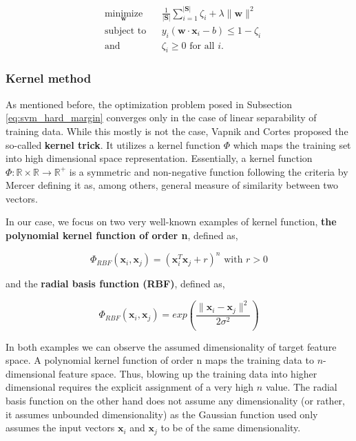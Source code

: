 \documentclass[pdftex,12pt,a4paper]{report}
\begin{document}
\begin{equation*}
\begin{aligned}
& \underset{\mathbf{
w}}{\text{minimize}}
& & \frac{1}{\vert \mathbf{S} \vert} \sum_{i=1}^{\vert \mathbf{S} \vert} \zeta_i + \lambda \| \mathbf{w} \|^2 \\
& \text{subject to}
& & y_i (\mathbf{w} \cdot \mathbf{x}_i - b) \leq 1 - \zeta_i \\
& \text{and} && \zeta_i \geq 0 \text{ for all } i.
\end{aligned}
\end{equation*}

\subsubsection*{Kernel method}

As mentioned before, the optimization problem posed in Subsection \ref{eq:svm_hard_margin} converges only in the case of linear separability of training data. While this mostly is not the case, Vapnik and Cortes \cite{cortes1995support} proposed the so-called \textbf{kernel trick}. It utilizes a kernel function $\Phi$ which maps the training set into high dimensional space representation. Essentially, a kernel function $\Phi: \mathbb{R} \times \mathbb{R} \rightarrow \mathbb{R}^+$ is a symmetric and non-negative function following the criteria by Mercer \cite{mercer1909functions} defining it as, among others, general measure of similarity between two vectors.

In our case, we focus on two very well-known examples of kernel function, \textbf{the polynomial kernel function of order n}, defined as,

\begin{equation}
\Phi_{RBF}(\mathbf{x}_i, \mathbf{x}_j) = \left(\mathbf{x}_i^T \mathbf{x}_j + r \right)^n \text{ with } r > 0
\label{eq:svm_rbf}
\end{equation} 

and the \textbf{radial basis function (RBF)}, defined as,

\begin{equation}
\Phi_{RBF}(\mathbf{x}_i, \mathbf{x}_j) = exp\left(\frac{\| \mathbf{x}_i - \mathbf{x}_j \|^2}{2 \sigma^2}\right)
\label{eq:svm_rbf}
\end{equation}

In both examples we can observe the assumed dimensionality of target feature space. A polynomial kernel function of order n maps the training data to $n$-dimensional feature  space. Thus, blowing up the training data into higher dimensional requires the explicit assignment of a very high $n$ value. The  radial basis function on the other hand does not assume any dimensionality (or rather, it assumes unbounded dimensionality) as the Gaussian function used only assumes the input vectors $\mathbf{x}_i$ and $\mathbf{x}_j$ to be of the same dimensionality. 
\end{document}
